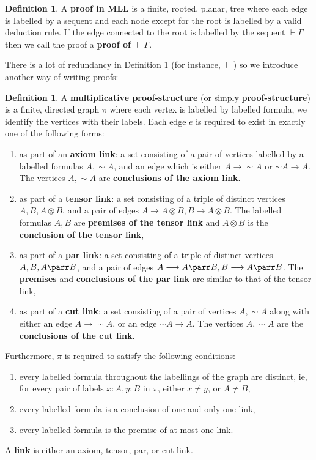 \documentclass[12pt]{article}
\theoremstyle{plain}
\theoremstyle{definition}
\newtheorem{defn}[thm]{Definition} %
\newcommand{\lto}{\longrightarrow}
\newcommand{\negation}{\sim}
\begin{document}
\begin{defn}\label{def:proof}
A \textbf{proof in MLL} is a finite, rooted, planar, tree where each edge is labelled by a sequent and each node except for the root is labelled by a valid deduction rule. If the edge connected to the root is labelled by the sequent $\vdash \Gamma$ then we call the proof a \textbf{proof of $\vdash \Gamma$}.
\end{defn}
There is a lot of redundancy in Definition \ref{def:proof} (for instance, $\vdash$) so we introduce another way of writing proofs:
\begin{defn}\label{def:proof_structures}
A \textbf{multiplicative proof-structure} (or simply \textbf{proof-structure}) is a finite, directed graph $\pi$ where each vertex is labelled by labelled formula, we identify the vertices with their labels. Each edge $e$ is required to exist in exactly one of the following forms:
\begin{enumerate}
\item as part of an \textbf{axiom link}: a set consisting of a pair of vertices labelled by a labelled formulas $A, \negation A$, and an edge which is either $A \lto \negation A$ or $\negation A \lto A$. The vertices $A, \negation A$ are \textbf{conclusions of the axiom link}.
\item as part of a \textbf{tensor link}: a set consisting of a triple of distinct vertices $A, B, A\otimes B$,  and a pair of edges $A \lto A \otimes B, B \lto A \otimes B$. The labelled formulas $A, B$ are \textbf{premises of the tensor link} and $A \otimes B$ is the \textbf{conclusion of the tensor link},
\item as part of a \textbf{par link}: a set consisting of a triple of distinct vertices $A, B, A \parr B$, and a pair of edges $A \lto A \parr B,B \lto A \parr B$. The \textbf{premises} and \textbf{conclusions of the par link} are similar to that of the tensor link,
\item as part of a \textbf{cut link}: a set consisting of a pair of vertices $A, \negation A$ along with either an edge $A \lto \negation A$, or an edge $\negation A \lto A$. The vertices $A, \negation A$ are the \textbf{conclusions of the cut link}.
\end{enumerate}
Furthermore, $\pi$ is required to satisfy the following conditions:
\begin{enumerate}
\item\label{def:proof_structure_distinct_occurrences} every labelled formula throughout the labellings of the graph are distinct, ie, for every pair of labels $x:A, y:B$ in $\pi$, either $x \neq y$, or $A \neq B$,
\item every labelled formula is a conclusion of one and only one link,
\item every labelled formula is the premise of at most one link.
\end{enumerate}
A \textbf{link} is either an axiom, tensor, par, or cut link.
\end{defn}
\end{document}
